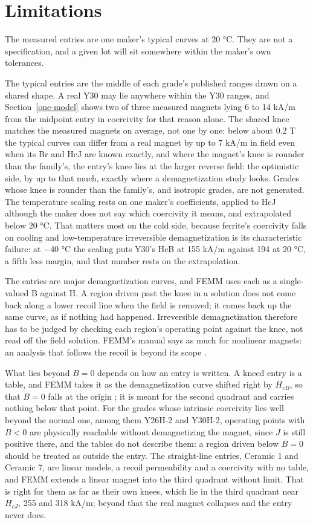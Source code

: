 \documentclass[
  11pt,
]{article}
\begin{document}
\section{Limitations}\label{limitations}

The measured entries are one maker's typical curves at 20 °C. They are not a specification, and a given lot will sit somewhere within the maker's own tolerances.

The typical entries are the middle of each grade's published ranges drawn on a shared shape. A real Y30 may lie anywhere within the Y30 ranges, and Section~\ref{one-model} shows two of three measured magnets lying 6 to 14 kA/m from the midpoint entry in coercivity for that reason alone. The shared knee matches the measured magnets on average, not one by one: below about 0.2 T the typical curves can differ from a real magnet by up to 7 kA/m in field even when its Br and HcJ are known exactly, and where the magnet's knee is rounder than the family's, the entry's knee lies at the larger reverse field: the optimistic side, by up to that much, exactly where a demagnetization study looks. Grades whose knee is rounder than the family's, and isotropic grades, are not generated. The temperature scaling rests on one maker's coefficients, applied to HcJ although the maker does not say which coercivity it means, and extrapolated below 20 °C. That matters most on the cold side, because ferrite's coercivity falls on cooling and low-temperature irreversible demagnetization is its characteristic failure: at $-$40 °C the scaling puts Y30's HcB at 155 kA/m against 194 at 20 °C, a fifth less margin, and that number rests on the extrapolation.

The entries are major demagnetization curves, and FEMM uses each as a single-valued B against H. A region driven past the knee in a solution does not come back along a lower recoil line when the field is removed; it comes back up the same curve, as if nothing had happened. Irreversible demagnetization therefore has to be judged by checking each region's operating point against the knee, not read off the field solution. FEMM's manual says as much for nonlinear magnets: an analysis that follows the recoil is beyond its scope \cite{femm-manual}.

What lies beyond \(B = 0\) depends on how an entry is written. A kneed entry is a table, and FEMM takes it as the demagnetization curve shifted right by \(H_{cB}\), so that \(B = 0\) falls at the origin \cite{femm-manual}; it is meant for the second quadrant and carries nothing below that point. For the grades whose intrinsic coercivity lies well beyond the normal one, among them Y26H-2 and Y30H-2, operating points with \(B < 0\) are physically reachable without demagnetizing the magnet, since \(J\) is still positive there, and the tables do not describe them: a region driven below \(B = 0\) should be treated as outside the entry. The straight-line entries, Ceramic 1 and Ceramic 7, are linear models, a recoil permeability and a coercivity with no table, and FEMM extends a linear magnet into the third quadrant without limit. That is right for them as far as their own knees, which lie in the third quadrant near \(H_{cJ}\), 255 and 318 kA/m; beyond that the real magnet collapses and the entry never does.
\end{document}
